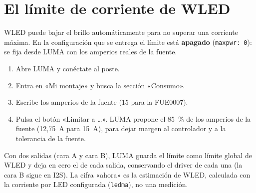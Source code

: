 \section{El límite de corriente de WLED}

WLED puede bajar el brillo automáticamente para no superar una corriente máxima. En la configuración que se entrega el límite está \textbf{apagado} (\texttt{maxpwr: 0}): se fija desde LUMA con los amperios reales de la fuente.

\begin{enumerate}
\item Abre LUMA y conéctate al poste.
\item Entra en «Mi montaje» y busca la sección «Consumo».
\item Escribe los amperios de la fuente (15 para la FUE0007).
\item Pulsa el botón «Limitar a …». LUMA propone el 85~\% de los amperios de la fuente (12,75~A para 15~A), para dejar margen al controlador y a la tolerancia de la fuente.
\end{enumerate}


Con dos salidas (cara A y cara B), LUMA guarda el límite como límite global de WLED y deja en cero el de cada salida, conservando el driver de cada una (la cara B sigue en I2S). La cifra «ahora» es la estimación de WLED, calculada con la corriente por LED configurada (\texttt{ledma}), no una medición.

